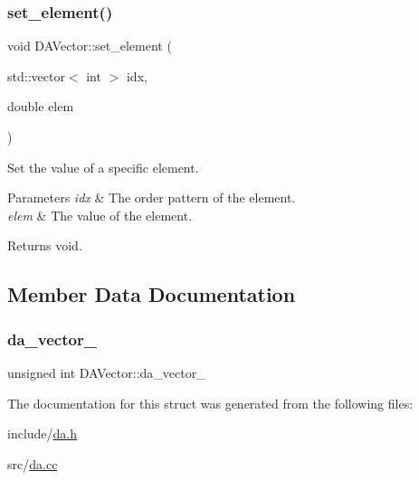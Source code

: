 \subsubsection{\texorpdfstring{set\_element()}{set\_element()}\hspace{0.1cm}{\footnotesize\ttfamily [2/2]}}
{\footnotesize\ttfamily void D\+A\+Vector\+::set\+\_\+element (\begin{DoxyParamCaption}\item[{std\+::vector$<$ int $>$}]{idx,  }\item[{double}]{elem }\end{DoxyParamCaption})}



Set the value of a specific element. 


\begin{DoxyParams}{Parameters}
{\em idx} & The order pattern of the element. \\
\hline
{\em elem} & The value of the element. \\
\hline
\end{DoxyParams}
\begin{DoxyReturn}{Returns}
void. 
\end{DoxyReturn}


\subsection{Member Data Documentation}
\mbox{\label{struct_d_a_vector_a359a2e0b8e48c6e481b48b5972e7631c}} 
\subsubsection{\texorpdfstring{da\_vector\_}{da\_vector\_}}
{\footnotesize\ttfamily unsigned int D\+A\+Vector\+::da\+\_\+vector\+\_\+}



The documentation for this struct was generated from the following files\+:\begin{DoxyCompactItemize}
\item 
include/\mbox{\hyperlink{da_8h}{da.\+h}}\item 
src/\mbox{\hyperlink{da_8cc}{da.\+cc}}\end{DoxyCompactItemize}
